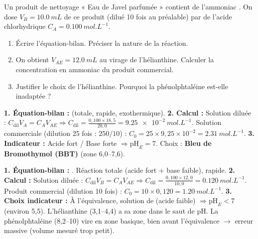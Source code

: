 \documentclass[11pt]{article}
\begin{document}
\begin{exercice}
Un produit de nettoyage « Eau de Javel parfumée » contient de l'ammoniac . On dose $V_B = \SI{10,0}{mL}$ de ce produit (dilué 10 fois au préalable) par de l'acide chlorhydrique $C_A = \SI{0,100}{mol.L^{-1}}$.
\begin{enumerate}
\item Écrire l'équation-bilan. Préciser la nature de la réaction.
\item On obtient $V_{AE} = \SI{12,0}{mL}$ au virage de l'hélianthine. Calculer la concentration en ammoniac du produit commercial.
\item Justifier le choix de l'hélianthine. Pourquoi la phénolphtaléine est-elle inadaptée ?
\end{enumerate}
\end{exercice}

\begin{corrige}
\textbf{1. Équation-bilan :}  (totale, rapide, exothermique).
\textbf{2. Calcul :} Solution diluée : $C_{\text{dil}} V_A = C_A V_{AE} \Rightarrow C_{\text{dil}} = \frac{0,100 \times 18,5}{20,0} = \SI{9,25e-2}{mol.L^{-1}}$.
Solution commerciale (dilution 25 fois : $250/10$) : $C_0 = 25 \times 9,25\times10^{-2} = \SI{2,31}{mol.L^{-1}}$.
\textbf{3. Indicateur :} Acide fort / Base forte $\Rightarrow \mathrm{pH}_E = 7$. Choix : \textbf{Bleu de Bromothymol (BBT)} (zone 6,0--7,6).
\end{corrige}

\begin{corrige}
\textbf{1. Équation-bilan :} . Réaction totale (acide fort + base faible), rapide.
\textbf{2. Calcul :} Solution diluée : $C_{\text{dil}} V_B = C_A V_{AE} \Rightarrow C_{\text{dil}} = \frac{0,100 \times 12,0}{10,0} = \SI{0,120}{mol.L^{-1}}$.
Produit commercial (dilution 10 fois) : $C_0 = 10 \times 0,120 = \SI{1,20}{mol.L^{-1}}$.
\textbf{3. Choix indicateur :} À l'équivalence, solution de  (acide faible) $\Rightarrow \mathrm{pH}_E < 7$ (environ 5,5). L'hélianthine (3,1--4,4) a sa zone dans le saut de pH. La phénolphtaléine (8,2--10) vire en zone basique, bien avant l'équivalence $\rightarrow$ erreur massive (volume mesuré trop petit).
\end{corrige}
\end{document}
